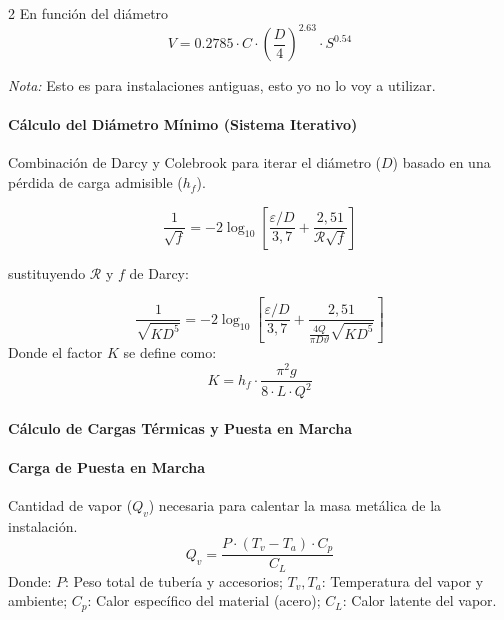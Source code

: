 \documentclass[11pt]{article}
\begin{document}
\begin{multicols*}{2}
        En función del diámetro
        \begin{equation}
            V = 0.2785 \cdot C \cdot \left(\frac{D}{4}\right)^{2.63} \cdot S^{0.54}
        \end{equation}

        \textit{Nota:} Esto es para instalaciones antiguas, esto yo no lo voy a utilizar.
    \paragraph*{Cálculo del Diámetro Mínimo (Sistema Iterativo)}
    Combinación de Darcy y Colebrook para iterar el diámetro ($D$) basado en una pérdida de carga admisible ($h_f$).

    \begin{equation}
        \frac{1}{\sqrt{f}}= -2 \log_{10} \left[ \frac{\varepsilon/D}{3,7} + \frac{2,51}{\mathcal{R}\sqrt{f}} \right]
    \end{equation}
    
    sustituyendo $\mathcal{R}$ y $f$ de Darcy:
    
    \begin{equation}
        \frac{1}{\sqrt{K D^5}} = -2 \log_{10} \left[ \frac{\varepsilon/D}{3,7} + \frac{2,51}{\frac{4Q}{\pi D \vartheta} \sqrt{K D^5}} \right]
    \end{equation}
    Donde el factor $K$ se define como:
    \begin{equation}
        K = h_f \cdot \frac{\pi^2 g}{8 \cdot L \cdot Q^2}
    \end{equation}
    
    \paragraph*{Cálculo de Cargas Térmicas y Puesta en Marcha}
    
    \paragraph*{Carga de Puesta en Marcha}
    Cantidad de vapor ($Q_v$) necesaria para calentar la masa metálica de la instalación.
    \begin{equation}
        Q_v = \frac{P \cdot (T_v - T_a) \cdot C_p}{C_L}
    \end{equation}
    Donde: $P$: Peso total de tubería y accesorios; $T_v, T_a$: Temperatura del vapor y ambiente; $C_p$: Calor específico del material (acero); $C_L$: Calor latente del vapor.
    

\end{multicols*}
\end{document}
